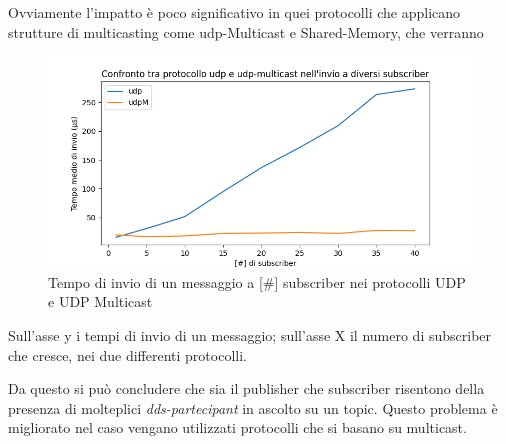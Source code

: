 Ovviamente l'impatto è poco significativo in quei protocolli che applicano strutture di multicasting come udp-Multicast e Shared-Memory, che verranno 

\begin{figure}[H]
        \includegraphics[width=\textwidth]{./results/test3_udpvsudpM.png} 
        \caption{Tempo di invio di un messaggio a [\#] subscriber nei protocolli UDP e UDP Multicast}\label{fig:udpvsudpMfigure}
\end{figure}
\noindent Sull'asse y i tempi di invio di un messaggio; sull'asse X il numero di subscriber che cresce, nei due differenti protocolli.

Da questo si può concludere che sia il publisher che subscriber risentono della presenza di molteplici \emph{dds-partecipant} in ascolto su un topic. Questo problema è migliorato nel caso vengano utilizzati protocolli che si basano su multicast. 

